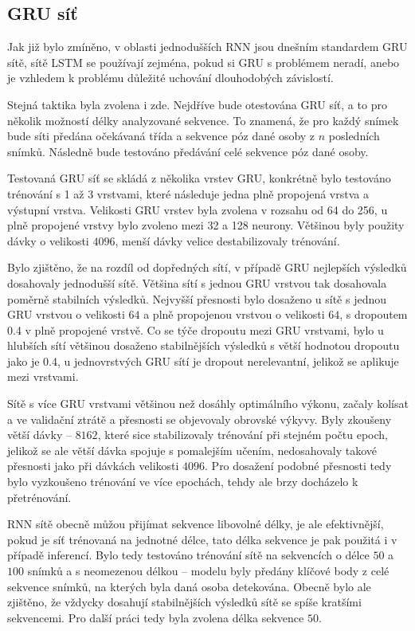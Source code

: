\subsection{GRU síť}

Jak již bylo zmíněno, v oblasti jednodušších RNN jsou dnešním standardem GRU
sítě, sítě LSTM se používají zejména, pokud si GRU s problémem neradí, anebo je
vzhledem k problému důležité uchování dlouhodobých závislostí.

Stejná taktika byla zvolena i zde. Nejdříve bude otestována GRU síť, a to pro
několik možností délky analyzované sekvence. To znamená, že pro každý snímek
bude síti předána očekávaná třída a sekvence póz dané osoby z $n$ posledních
snímků. Následně bude testováno předávání celé sekvence póz dané osoby.

Testovaná GRU síť se skládá z několika vrstev GRU, konkrétně bylo testováno
trénování s 1 až 3 vrstvami, které následuje jedna plně propojená vrstva a
výstupní vrstva. Velikosti GRU vrstev byla zvolena v rozsahu od 64 do 256, u
plně propojené vrstvy bylo zvoleno mezi 32 a 128 neurony. Většinou byly použity
dávky o velikosti $4096$, menší dávky velice destabilizovaly trénování.

Bylo zjištěno, že na rozdíl od dopředných sítí, v případě GRU nejlepších
výsledků dosahovaly jednodušší sítě. Většina sítí s jednou GRU vrstvou tak
dosahovala poměrně stabilních výsledků. Nejvyšší přesnosti bylo dosaženo u sítě
s jednou GRU vrstvou o velikosti $64$ a plně propojenou vrstvou o velikosti
$64$, s dropoutem 0.4 v plně propojené vrstvě. Co se týče dropoutu mezi GRU
vrstvami, bylo u hlubších sítí většinou dosaženo stabilnějších výsledků s větší
hodnotou dropoutu jako je 0.4, u jednovrstvých GRU sítí je dropout
nerelevantní, jelikož se aplikuje mezi vrstvami.

Sítě s více GRU vrstvami většinou než dosáhly optimálního výkonu, začaly
kolísat a ve validační ztrátě a přesnosti se objevovaly obrovské výkyvy. Byly
zkoušeny větší dávky – $8162$, které sice stabilizovaly trénování při stejném
počtu epoch, jelikož se ale větší dávka spojuje s pomalejším učením,
nedosahovaly takové přesnosti jako při dávkách velikosti $4096$. Pro dosažení
podobné přesnosti tedy bylo vyzkoušeno trénování ve více epochách, tehdy ale
brzy docházelo k přetrénování.

RNN sítě obecně můžou přijímat sekvence libovolné délky, je ale efektivnější,
pokud je síť trénovaná na jednotné délce, tato délka sekvence je pak použitá i
v případě inferencí. Bylo tedy testováno trénování sítě na sekvencích o délce
$50$ a $100$ snímků a s neomezenou délkou – modelu byly předány klíčové body z
celé sekvence snímků, na kterých byla daná osoba detekována. Obecně bylo ale
zjištěno, že vždycky dosahují stabilnějších výsledků sítě se spíše kratšími
sekvencemi. Pro další práci tedy byla zvolena délka sekvence $50$.

